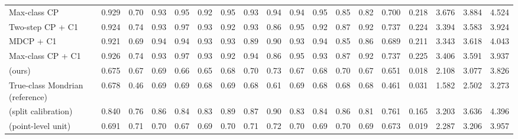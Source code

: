 \begin{table}[!htbp]
{\begin{tabular}{lccccccccccccccccc}
Max-class CP & 0.929 & 0.70 & 0.93 & 0.95 & 0.92 & 0.95 & 0.93 & 0.94 & 0.94 & 0.95 & 0.85 & 0.82 & 0.700 & 0.218 & 3.676 & 3.884 & 4.524 \\
Two-step CP + C1 & 0.924 & 0.74 & 0.93 & 0.97 & 0.93 & 0.92 & 0.93 & 0.86 & 0.95 & 0.92 & 0.87 & 0.92 & 0.737 & 0.224 & 3.394 & 3.583 & 3.924 \\
MDCP + C1 & 0.921 & 0.69 & 0.94 & 0.94 & 0.93 & 0.93 & 0.89 & 0.90 & 0.93 & 0.94 & 0.85 & 0.86 & 0.689 & 0.211 & 3.343 & 3.618 & 4.043 \\
Max-class CP + C1 & 0.926 & 0.74 & 0.93 & 0.97 & 0.93 & 0.92 & 0.94 & 0.86 & 0.95 & 0.93 & 0.87 & 0.92 & 0.737 & 0.225 & 3.406 & 3.591 & 3.937 \\
\gamut{} (ours) & 0.675 & 0.67 & 0.69 & 0.66 & 0.65 & 0.68 & 0.70 & 0.73 & 0.67 & 0.68 & 0.70 & 0.67 & 0.651 & 0.018 & 2.108 & 3.077 & 3.826 \\
True-class Mondrian (reference) & 0.678 & 0.46 & 0.69 & 0.69 & 0.68 & 0.69 & 0.68 & 0.61 & 0.69 & 0.68 & 0.68 & 0.68 & 0.461 & 0.031 & 1.582 & 2.502 & 3.273 \\
\gamut{} (split calibration) & 0.840 & 0.76 & 0.86 & 0.84 & 0.83 & 0.89 & 0.87 & 0.90 & 0.83 & 0.84 & 0.86 & 0.81 & 0.761 & 0.165 & 3.203 & 3.636 & 4.396 \\
\gamut{} (point-level unit) & 0.691 & 0.71 & 0.70 & 0.67 & 0.69 & 0.70 & 0.71 & 0.72 & 0.70 & 0.69 & 0.70 & 0.69 & 0.673 & 0.019 & 2.287 & 3.206 & 3.957 \\
\bottomrule
\end{tabular}}
\end{table}
\FloatBarrier

